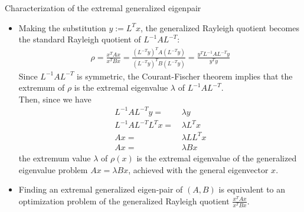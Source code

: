 \documentclass[t,usepdftitle=false]{beamer}
\begin{document}
\begin{frame}{Characterization of the extremal generalized eigenpair}
\begin{itemize}
\item[] Making the substitution $y:=L^Tx$, the generalized Rayleigh quotient becomes the standard Rayleigh quotient of $L^{-1}AL^{-T}$:
\begin{align*}
\rho = \frac{x^TAx}{x^TBx} = \frac{(L^{-T}y)^TA(L^{-T}y)}{(L^{-T}y)^TB(L^{-T}y)} = \frac{y^TL^{-1}AL^{-T}y}{y^Ty}
\end{align*}
Since $L^{-1}AL^{-T}$ is symmetric, the Courant-Fischer theorem implies that the extremum of $\rho$ is the extremal eigenvalue $\lambda$ of $L^{-1}AL^{-T}$.\vspace{.07cm}\\
Then, since we have\vspace{-.6cm}
\begin{align*}
L^{-1}AL^{-T}y=&\,\lambda y\\
L^{-1}AL^{-T}L^Tx=&\,\lambda L^Tx\\
Ax=&\, \lambda LL^Tx\\
Ax=&\,\lambda Bx
\end{align*}
the extremum value $\lambda$ of $\rho(x)$ is the extremal eigenvalue of the generalized eigenvalue problem $Ax = \lambda Bx$, achieved with the general eigenvector $x$.
\item Finding an extremal generalized eigen-pair of $(A,B)$ is equivalent to an optimization problem of the generalized Rayleigh quotient $\frac{x^TAx}{x^TBx}$.
\end{itemize}
\end{frame}	
	
\end{document}
